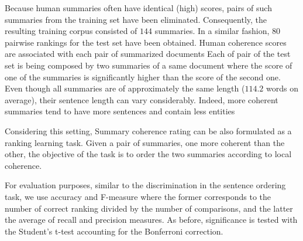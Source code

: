 Because human summaries often have identical (high) scores, pairs of such summaries from the training set have been eliminated. 
Consequently, the resulting training corpus consisted of $144$ summaries. 
In a similar fashion, $80$ pairwise rankings for the test set have been obtained. 
Human coherence scores are associated with each pair of summarized documents \cite{barzilay08} Each of pair of the test set is being composed by two summaries of a same document where the score of one of the summaries is significantly higher than the score of the second one. 
Even though all summaries are of approximately the same length ($114.2$ words on average), their sentence length can vary considerably. 
Indeed, more coherent summaries tend to have more sentences and contain less entities


Considering this setting, Summary coherence rating can be also formulated as a ranking learning task.
Given a pair of summaries, one more coherent than the other, the objective of the task is to order the two summaries according to local coherence.

For evaluation purposes, similar to the discrimination  in the sentence ordering task, we use  accuracy and F-measure where the former corresponds to the number of correct ranking divided by the number of comparisons, and the latter the average of recall and precision measures.
As before, significance is tested with the Student’s t-test accounting for the Bonferroni correction.


